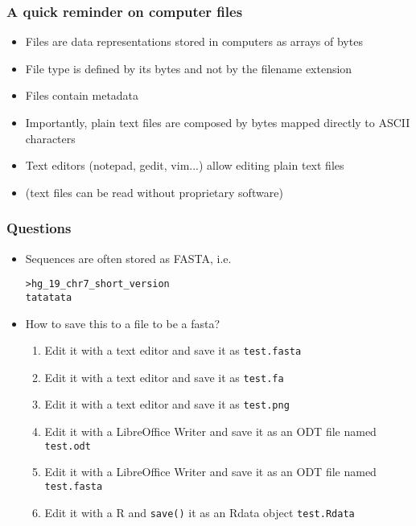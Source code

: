 \documentclass{beamer}
\begin{document}




\begin{frame}
  \frametitle{A quick reminder on computer files}
  \begin{itemize}
  \item  Files are data representations stored in computers as arrays of bytes
  \item File type is defined by its bytes and not by the filename extension
  \item Files contain metadata
  \item Importantly, plain text files are composed by bytes mapped directly to ASCII characters
  \item Text editors (notepad, gedit, vim...) allow editing plain text files
  \item (text files can be read without proprietary software)
  \end{itemize}
\end{frame}


\begin{frame}[fragile]
  \frametitle{Questions}
  \begin{itemize}
  \item Sequences are often stored as FASTA, i.e.
\begin{verbatim}
>hg_19_chr7_short_version
tatatata
\end{verbatim}
  \item How to save this to a file to be a fasta?
    \begin{enumerate}
    \item Edit it with a text editor and save it as \texttt{test.fasta}
    \item Edit it with a text editor and save it as \texttt{test.fa}
    \item Edit it with a text editor and save it as \texttt{test.png}
    \item Edit it with a LibreOffice Writer and save it as an ODT file named \texttt{test.odt}
    \item Edit it with a LibreOffice Writer and save it as an ODT file named \texttt{test.fasta}
    \item Edit it with a R and \texttt{save()} it as an Rdata object \texttt{test.Rdata}
    \end{enumerate}
  \end{itemize}
\end{frame}
\end{document}
